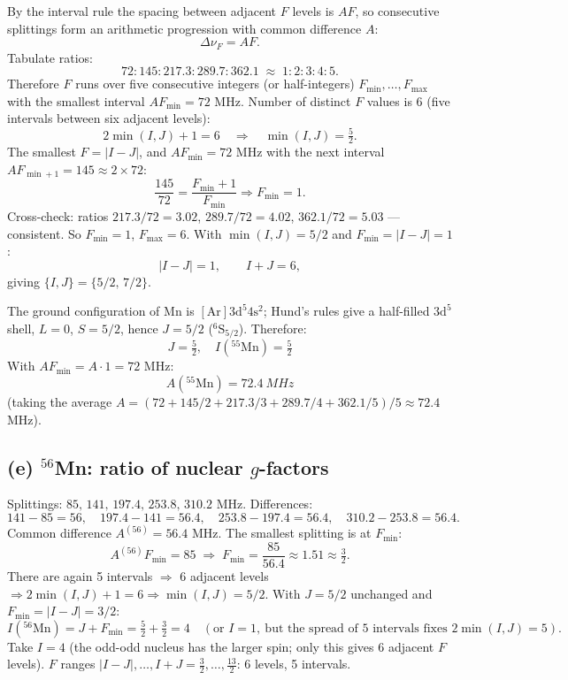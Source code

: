 \documentclass[11pt]{article}
\begin{document}
By the interval rule the spacing between adjacent $F$ levels is $A F$, so consecutive splittings form an arithmetic progression with common difference $A$:
\[
\Delta\nu_{F}=AF.
\]
Tabulate ratios:
\[
72:145:217.3:289.7:362.1 \;\approx\; 1:2:3:4:5.
\]
Therefore $F$ runs over five consecutive integers (or half-integers) $F_{\min},\dots,F_{\max}$ with the smallest interval $AF_{\min}=72$ MHz.
Number of distinct $F$ values is $6$ (five intervals between six adjacent levels):
\[
2\min(I,J)+1=6\quad\Longrightarrow\quad \min(I,J)=\tfrac{5}{2}.
\]
The smallest $F=|I-J|$, and $AF_{\min}=72$ MHz with the next interval $AF_{\min{+}1}=145\approx 2\times72$:
\[
\frac{145}{72}=\frac{F_{\min}+1}{F_{\min}}\Rightarrow F_{\min}=1.
\]
Cross-check: ratios $217.3/72=3.02$, $289.7/72=4.02$, $362.1/72=5.03$ --- consistent. So $F_{\min}=1$, $F_{\max}=6$. With $\min(I,J)=5/2$ and $F_{\min}=|I-J|=1$:
\[
|I-J|=1,\qquad I+J=6,
\]
giving $\{I,J\}=\{5/2,\,7/2\}$.

The ground configuration of Mn is $[\mathrm{Ar}]3\mathrm{d}^{5}4\mathrm{s}^{2}$; Hund's rules give a half-filled $3\mathrm{d}^{5}$ shell, $L=0$, $S=5/2$, hence $J=5/2$ ($^{6}\!\mathrm{S}_{5/2}$). Therefore:
\[
\boxed{\;J=\tfrac{5}{2},\quad I({}^{55}\mathrm{Mn})=\tfrac{5}{2}\;}
\]
With $AF_{\min}=A\cdot 1=72$ MHz:
\[
\boxed{\;A({}^{55}\mathrm{Mn})=\SI{72.4}{MHz}\;}
\]
(taking the average $A=(72+145/2+217.3/3+289.7/4+362.1/5)/5\approx 72.4$ MHz).

\subsection*{(e) \texorpdfstring{$^{56}$Mn}{56Mn}: ratio of nuclear \texorpdfstring{$g$}{g}-factors}

Splittings: $85,\,141,\,197.4,\,253.8,\,310.2$ MHz. Differences:
\[
141-85=56,\quad 197.4-141=56.4,\quad 253.8-197.4=56.4,\quad 310.2-253.8=56.4.
\]
Common difference $A^{(56)}=56.4$ MHz. The smallest splitting is at $F_{\min}$:
\[
A^{(56)}F_{\min}=85\;\Rightarrow\;F_{\min}=\frac{85}{56.4}\approx 1.51\approx \tfrac{3}{2}.
\]
There are again 5 intervals $\Rightarrow$ 6 adjacent levels $\Rightarrow 2\min(I,J)+1=6\Rightarrow \min(I,J)=5/2$. With $J=5/2$ unchanged and $F_{\min}=|I-J|=3/2$:
\[
I({}^{56}\mathrm{Mn})=J+F_{\min}=\tfrac{5}{2}+\tfrac{3}{2}=4\quad(\text{or }I=1,\ \text{but the spread of 5 intervals fixes }2\min(I,J)=5).
\]
Take $I=4$ (the odd-odd nucleus has the larger spin; only this gives 6 adjacent $F$ levels). $F$ ranges $|I-J|,\dots,I+J=\tfrac{3}{2},\dots,\tfrac{13}{2}$: 6 levels, 5 intervals.
\end{document}
